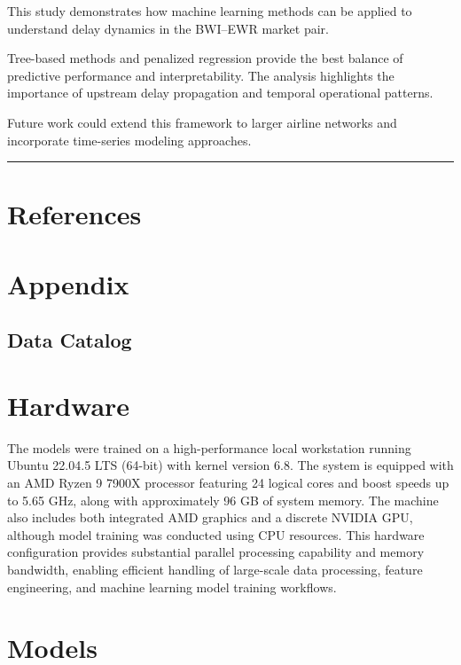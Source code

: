 \documentclass[
  letterpaper,
  DIV=11,
  numbers=noendperiod]{scrartcl}
\begin{document}
This study demonstrates how machine learning methods can be applied to
understand delay dynamics in the BWI--EWR market pair.

Tree-based methods and penalized regression provide the best balance of
predictive performance and interpretability. The analysis highlights the
importance of upstream delay propagation and temporal operational
patterns.

Future work could extend this framework to larger airline networks and
incorporate time-series modeling approaches.

\begin{center}\rule{0.5\linewidth}{0.5pt}\end{center}

\section{References}\label{references}

\section{Appendix}\label{appendix}

\subsection{Data Catalog}\label{data-catalog}

\section{Hardware}\label{hardware}

The models were trained on a high-performance local workstation running
Ubuntu 22.04.5 LTS (64-bit) with kernel version 6.8. The system is
equipped with an AMD Ryzen 9 7900X processor featuring 24 logical cores
and boost speeds up to 5.65 GHz, along with approximately 96 GB of
system memory. The machine also includes both integrated AMD graphics
and a discrete NVIDIA GPU, although model training was conducted using
CPU resources. This hardware configuration provides substantial parallel
processing capability and memory bandwidth, enabling efficient handling
of large-scale data processing, feature engineering, and machine
learning model training workflows.

\section{Models}\label{models}
\end{document}
